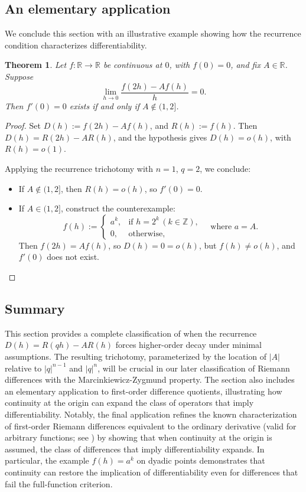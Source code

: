 \documentclass{raex}
\newtheorem{theorem}{Theorem}
\theoremstyle{definition}
\begin{document}
\subsection{An elementary application}

We conclude this section with an illustrative example showing how the recurrence condition characterizes differentiability.

\begin{theorem}
Let \( f \colon \mathbb{R} \to \mathbb{R} \) be continuous at \( 0 \), with \( f(0) = 0 \), and fix \( A \in \mathbb{R} \). Suppose
\[
\lim_{h \to 0} \frac{f(2h) - A f(h)}{h} = 0.
\]
Then \( f'(0) = 0 \) exists if and only if \( A \notin (1,2] \).
\end{theorem}

\begin{proof}
Set \( D(h) := f(2h) - A f(h) \), and \( R(h) := f(h) \). Then \( D(h) = R(2h) - A R(h) \), and the hypothesis gives \( D(h) = o(h) \), with \( R(h) = o(1) \).

Applying the recurrence trichotomy with \( n = 1 \), \( q = 2 \), we conclude:
\begin{itemize}
  \item If \( A \notin (1, 2] \), then \( R(h) = o(h) \), so \( f'(0) = 0 \).
  \item If \( A \in (1, 2] \), construct the counterexample:
  \[
  f(h) :=
  \begin{cases}
  a^k, & \text{if } h = 2^k \, (k \in \mathbb{Z}), \\
  0, & \text{otherwise},
  \end{cases} \quad \text{where } a = A.
  \]
  Then \( f(2h) = A f(h) \), so \( D(h) = 0 = o(h) \), but \( f(h) \not= o(h) \), and \( f'(0) \) does not exist.
\end{itemize}
\end{proof}

\subsection*{Summary}

This section provides a complete classification of when the recurrence \( D(h) = R(qh) - A R(h) \) forces higher-order decay under minimal assumptions. The resulting trichotomy, parameterized by the location of \( |A| \) relative to \( |q|^{n-1} \) and \( |q|^n \), will be crucial in our later classification of Riemann differences with the Marcinkiewicz-Zygmund property. The section also includes an elementary application to first-order difference quotients, illustrating how continuity at the origin can expand the class of operators that imply differentiability.
Notably, the final application refines the known characterization of first-order Riemann differences equivalent to the ordinary derivative (valid for arbitrary functions; see \cite{ACC}) by showing that when continuity at the origin is assumed, the class of differences that imply differentiability expands. In particular, the example \( f(h) = a^k \) on dyadic points demonstrates that continuity can restore the implication of differentiability even for differences that fail the full-function criterion.
\end{document}
